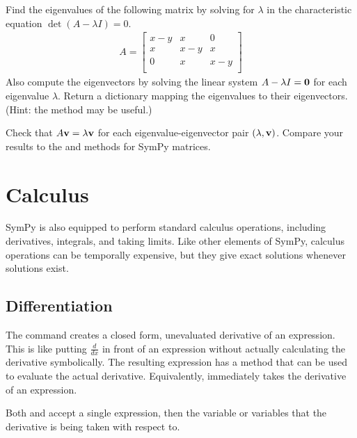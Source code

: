 \begin{problem}
Find the eigenvalues of the following matrix by solving for $\lambda$ in the characteristic equation $\det(A - \lambda I) = 0$.
\begin{align*}
A =
\left[\begin{array}{cccc}
x-y & x   & 0   \\
x   & x-y & x   \\
0   & x   & x-y \\
\end{array}\right]
\end{align*}
Also compute the eigenvectors by solving the linear system $A - \lambda I = \mathbf{0}$ for each eigenvalue $\lambda$.
Return a dictionary mapping the eigenvalues to their eigenvectors.
\\(Hint: the  method may be useful.)

Check that $A\mathbf{v} = \lambda\mathbf{v}$ for each eigenvalue-eigenvector pair $(\lambda, \mathbf{v})$.
Compare your results to the  and  methods for SymPy matrices.
\end{problem}

\section*{Calculus} %

SymPy is also equipped to perform standard calculus operations, including derivatives, integrals, and taking limits.
Like other elements of SymPy, calculus operations can be temporally expensive, but they give exact solutions whenever solutions exist.

\subsection*{Differentiation} %

The command  creates a closed form, unevaluated derivative of an expression.
This is like putting $\frac{d}{dx}$ in front of an expression without actually calculating the derivative symbolically.
The resulting expression has a  method that can be used to evaluate the actual derivative.
Equivalently,  immediately takes the derivative of an expression.

Both  and  accept a single expression, then the variable or variables that the derivative is being taken with respect to.

